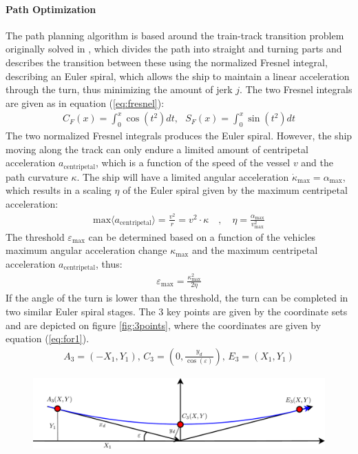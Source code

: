 \documentclass[a0,portrait]{a0poster}
\begin{document}
\begin{center}
{\paragraph{Path Optimization}
The path planning algorithm is based around the train-track transition problem originally solved in \cite{arthur}, which divides the path into straight and turning parts and describes the transition between these using the normalized Fresnel integral, describing an Euler spiral, which allows the ship to maintain a linear acceleration through the turn, thus minimizing the amount of jerk $j$. The two Fresnel integrals are given as in equation (\ref{eq:fresnel}):
\begin{align}
C_F(x) = \int_0^x \cos(t^2)dt,\,\,\,\,S_F(x) = \int_0^x \sin(t^2)dt
\label{eq:fresnel}
\end{align}
The two normalized Fresnel integrals produces the Euler spiral. However, the ship moving along the track can only endure a limited amount of centripetal acceleration $a_\text{centripetal}$, which is a function of the speed of the vessel $v$ and the path curvature $\kappa$. The ship will have a limited angular acceleration $\dot{\kappa}_\text{max} = \alpha_\text{max}$, which results in a scaling $\eta$ of the Euler spiral given by the maximum centripetal acceleration:
\begin{align}
\text{max}\langle a_\text{centripetal}\rangle = \frac{v^2}{r} = v^2 \cdot \kappa \quad , \quad \eta = \frac{\alpha_\text{max}}{v^2_\text{max}}
\end{align}
The threshold $\varepsilon_\text{max}$ can be determined based on a function of the vehicles maximum angular acceleration change $\kappa_\text{max}$ and the maximum centripetal acceleration $a_\text{centripetal}$, thus:
\begin{align}
\varepsilon_\text{max} = \frac{\kappa^2_\text{max}}{2\eta}
\end{align}
If the angle of the turn is lower than the threshold, the turn can be completed in two similar Euler spiral stages. The 3 key points are given by the coordinate sets and are depicted on figure \ref{fig:3points}, where the coordinates are given by equation (\ref{eq:for1}).
\begin{align}
A_3 = (-X_1,Y_1),\, C_3 = (0,\frac{y_d}{\cos(\varepsilon)}),\, E_3 = (X_1,Y_1)
\label{eq:for1}
\end{align}
\begin{figure}
	\begin{center}
		\includegraphics[width=\threecolwidth]{img/3Points} %

\end{center}
\end{figure}}
\end{center}
\end{document}
